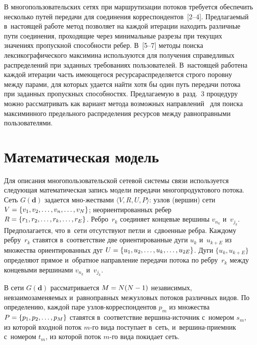 \begin{multicols}{2}
В многопользовательских сетях при маршрутизации потоков требуется обеспечить 
несколько \mbox{путей} передачи для  соединения корреспондентов~[2--4]. Предлагаемый  
в~настоящей работе метод позволяет на каждой итерации  находить  различные 
пути соединения, проходящие  через минимальные разрезы при текущих значениях 
пропускной способности ребер. В~[5--7] методы поиска лексикографического 
максимина используются для получения справедливых распределений при заданных 
требованиях пользователей. В~настоящей работе\linebreak  на каждой итерации  часть 
имеющегося ресурса\linebreak распределяется строго поровну  между парами, для которых 
удается найти хотя бы один путь передачи потока при заданных пропускных 
способностях. Предлагаемую  в~разд.~3 процедуру можно рас\-смат\-ри\-вать как 
вариант  метода возможных направлений~\cite{Zoyt}   для  поиска  максиминного  
предельного распределения   ресурсов между равноправными \mbox{пользователями}.  

\vspace*{-6pt}

\section{Математическая модель}

Для описания многопользовательской сетевой системы связи  используется 
следующая математическая запись модели передачи многопродуктового потока.
Сеть $G(\mathbf{d})$ задается мно-\linebreak жествами  $\langle V, R,  U, P \rangle$:
узлов (вершин) сети  $V \hm= \{ v_1, v_2, \ldots, v_n, \ldots, v_N \}$;
неориентированных \mbox{ребер} $R \hm= \{ r_1, r_2, \ldots, r_k, \ldots, r_E \}$.
Ребро~$r_k$ соединяет концевые вершины $v_{n_k}$ и~$v_{j_k}$. Предполагается, 
что в~сети отсутствуют петли и~сдвоенные ребра.
Каж\-до\-му ребру~$r_k$ ставятся в~соответствие две ориентированные дуги $u_k$ 
и~$u_{k+E}$ из множества ориентированных дуг  $U \hm= \{ u_1, u_2, \ldots, u_k, 
\ldots, u_{2E}\}$.
Дуги $\{u_k, u_{k+E}\}$ определяют прямое и~обратное на\-прав\-ле\-ние передачи 
потока по  ребру~$r_k$ между концевыми вершинами $v_{n_k}$ и~$v_{j_k}$.

В сети $G(\mathbf{d})$ рассматривается $M \hm= N (N\hm-1)$ независимых, 
невзаимозаменяемых и~равноправных межузловых потоков различных видов.
По определению, каждой паре узлов-корреспондентов $p_m$ из множества $P \hm= 
\{ p_1, p_2, \ldots, p_M\}$ ставятся в~соответствие вершина-источник 
с~номером $s_m$,  из которой  входной поток $m$-го вида поступает в~сеть, 
и~вер\-ши\-на-при\-ем\-ник с~номером ${t_m}$, из которой поток $m$-го вида покидает 
сеть.


\end{multicols}
